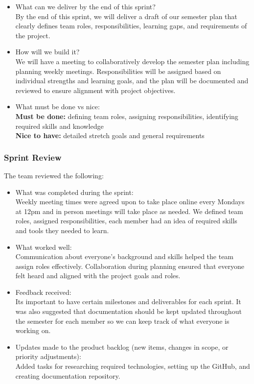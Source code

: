 \documentclass{article}
\begin{document}
\begin{itemize}
    \item What can we deliver by the end of this sprint? 
    \\By the end of this sprint, we will deliver a draft of our semester plan that clearly defines team roles, responsibilities, learning gaps, and requirements of the project.
    \item How will we build it? 
    \\We will have a meeting to collaboratively develop the semester plan including planning weekly meetings. Responsibilities will be assigned based on individual strengths and learning goals, and the plan will be documented and reviewed to ensure alignment with project objectives.
    \item What must be done vs nice:
    \\\textbf{Must be done:} defining team roles, assigning responsibilities, identifying required skills and knowledge
    \\\textbf{Nice to have:} detailed stretch goals and general requirements

\end{itemize}

\subsubsection{Sprint Review}
The team reviewed the following:

\begin{itemize}
    \item What was completed during the sprint:
    \\Weekly meeting times were agreed upon to take place online every Mondays at 12pm and in person meetings will take place as needed. We defined team roles, assigned responsibilities, each member had an idea of required skills and tools they needed to learn.
    \item What worked well:
    \\Communication about everyone's background and skills helped the team assign roles effectively. Collaboration during planning ensured that everyone felt heard and aligned with the project goals and roles.
    \item Feedback received:
    \\Its important to have certain milestones and deliverables for each sprint. It was also suggested that documentation should be kept updated throughout the semester for each member so we can keep track of what everyone is working on.

    \item Updates made to the product backlog (new items, changes in scope, or priority adjustments):
    \\Added tasks for researching required technologies, setting up the GitHub, and creating documentation repository.

\end{itemize}
\end{document}
